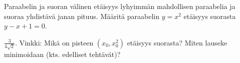 \begin{tehtavasivu}
\begin{tehtava}
Paraabelin ja suoran välinen etäisyys lyhyimmän mahdollisen paraabelia ja suoraa yhdistävä janan pituus. Määritä paraabelin $y = x^2$ etäisyys suorasta $y-x+1 = 0$.
\begin{vastaus}
	$\frac{3}{4\sqrt{2}}$. Vinkki: Mikä on pisteen $(x_0, x_0^2)$ etäisyys suorasta? Miten lauseke 
minimoidaan (kts. edelliset tehtävät)?
\end{vastaus}
\end{tehtava}



\end{tehtavasivu}